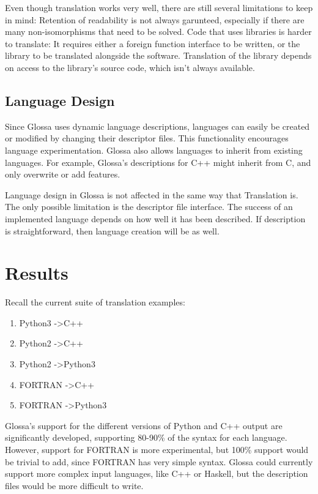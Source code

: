 \documentclass{article}
\begin{document}
Even though translation works very well, there are still several limitations to keep in mind:
Retention of readability is not always garunteed, especially if there are many non-isomorphisms that need to be solved.
Code that uses libraries is harder to translate: 
It requires either a foreign function interface to be written, or the library to be translated alongside the software. 
Translation of the library depends on access to the library's source code, which isn't always available.

\subsection{Language Design}

Since Glossa uses dynamic language descriptions, languages can easily be created or modified by changing their descriptor files. 
This functionality encourages language experimentation.
Glossa also allows languages to inherit from existing languages. 
For example, Glossa's descriptions for C++ might inherit from C, and only overwrite or add features.

Language design in Glossa is not affected in the same way that Translation is.
The only possible limitation is the descriptor file interface.
The success of an implemented language depends on how well it has been described.
If description is straightforward, then language creation will be as well.

\section{Results}

Recall the current suite of translation examples:
\begin{enumerate}
    \item Python3 -\textgreater C++
    \item Python2 -\textgreater C++ 
    \item Python2 -\textgreater Python3
    \item FORTRAN -\textgreater C++ 
    \item FORTRAN -\textgreater Python3 
\end{enumerate}

Glossa's support for the different versions of Python and C++ output are significantly developed, supporting 80-90\% of the syntax for each language. 
However, support for FORTRAN is more experimental, but 100\% support would be trivial to add, since FORTRAN has very simple syntax.
Glossa could currently support more complex input languages, like C++ or Haskell, but the description files would be more difficult to write.
\end{document}

